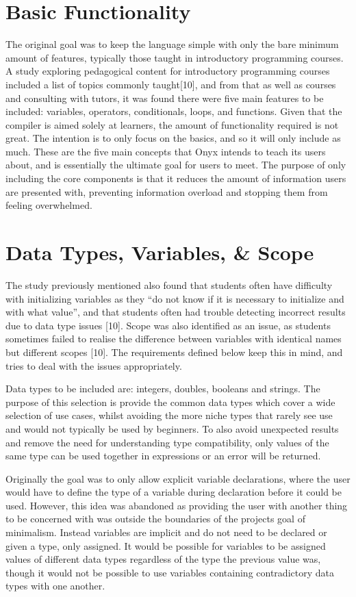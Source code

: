 \documentclass[
]{report}
\begin{document}
\section{Basic Functionality}
The original goal was to keep the language simple with only the bare
minimum amount of features, typically those taught in introductory
programming courses. A study exploring pedagogical content for
introductory programming courses included a list of topics commonly
taught{[}10{]}, and from that as well as courses and consulting with
tutors, it was found there were five main features to be included:
variables, operators, conditionals, loops, and functions. Given that the
compiler is aimed solely at learners, the amount of functionality
required is not great. The intention is to only focus on the basics, and
so it will only include as much. These are the five main concepts that
Onyx intends to teach its users about, and is essentially the ultimate
goal for users to meet. The purpose of only including the core
components is that it reduces the amount of information users are
presented with, preventing information overload and stopping them from
feeling overwhelmed.

\section{Data Types, Variables, \& Scope}
The study previously mentioned also found that students often have
difficulty with initializing variables as they ``do not know if it is
necessary to initialize and with what value'', and that students often
had trouble detecting incorrect results due to data type issues
{[}10{]}. Scope was also identified as an issue, as students sometimes
failed to realise the difference between variables with identical names
but different scopes {[}10{]}. The requirements defined below keep this
in mind, and tries to deal with the issues appropriately.

Data types to be included are: integers, doubles, booleans and strings.
The purpose of this selection is provide the common data types which
cover a wide selection of use cases, whilst avoiding the more niche
types that rarely see use and would not typically be used by beginners.
To also avoid unexpected results and remove the need for understanding
type compatibility, only values of the same type can be used together in
expressions or an error will be returned.

Originally the goal was to only allow explicit variable declarations,
where the user would have to define the type of a variable during
declaration before it could be used. However, this idea was abandoned as
providing the user with another thing to be concerned with was outside
the boundaries of the projects goal of minimalism. Instead variables are
implicit and do not need to be declared or given a type, only assigned.
It would be possible for variables to be assigned values of different
data types regardless of the type the previous value was, though it
would not be possible to use variables containing contradictory data
types with one another.
\end{document}
